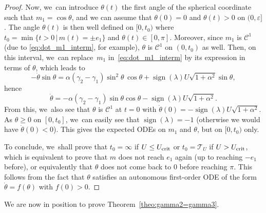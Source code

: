 \documentclass[10pt]{amsart}
\theoremstyle{definition}
\begin{document}
\begin{proof}
Now, we~can introduce $\theta (t)$ the first angle of the spherical coordinate such that $m_1 = \cos \theta$, and we can assume that $\theta (0) = 0$ and $\theta (t) > 0$ on $(0, \varepsilon]$. The angle $\theta (t)$ is then well defined on $[0, t_0)$ where $t_0 = \min \{ t > 0 \, | \, m(t) = \pm e_1 \}$ and $\theta (t) \in [0, \pi]$. Moreover, since $m_1$ is $\mathscr{C}^1$ (due to \eqref{eq:dot_m1_interm}, for example), $\theta$ is $\mathscr{C}^1$ on $(0, t_0)$ as well.
Then, on this interval, we~can replace~$m_1$ in~\eqref{eq:dot_m1_interm} by its expression in terms of $\theta$, which leads to
\begin{equation*}
- \dot{\theta} \sin{\theta} = \alpha (\gamma_2 - \gamma_1) \sin^2 \theta \, \cos{\theta} + \operatorname{sign} (\lambda) U \sqrt{1 + \alpha^2} \sin{\theta},
\end{equation*}
hence
\begin{equation*}
\dot{\theta} = - \alpha (\gamma_2 - \gamma_1) \sin{\theta} \cos{\theta} - \operatorname{sign} (\lambda) U \sqrt{1 + \alpha^2}.
\end{equation*}
From this, we~also see that $\theta$ is $\mathscr{C}^1$ at $t = 0$ with $\dot{\theta} (0) = - \operatorname{sign} (\lambda) U \sqrt{1 + \alpha^2}$.
As $\theta \geq 0$ on $[0, t_0]$, we~can easily see that $\operatorname{sign} (\lambda) = -1$ (otherwise we would have $\dot{\theta} (0) < 0$). This gives the expected ODEs on $m_1$ and $\theta$, but on $[0, t_0)$ only.

To conclude, we~shall prove that $t_0 = \infty$ if $U \leq U_\textnormal{crit}$ or $t_0 = \mathcal{T}_U$ if $U > U_\textnormal{crit}$, which is equivalent to prove that $m$ does not reach $e_1$ again (up to reaching $-e_1$ before), or equivalently that $\theta$ does not come back to $0$ before reaching $\pi$. This follows from the fact that $\theta$ satisfies an autonomous first-order ODE of the form $\dot \theta = f(\theta)$ with $f(0) > 0$.
\end{proof}

We are now in position to prove Theorem~\ref{theo:gamma2=gamma3}.
\end{document}
